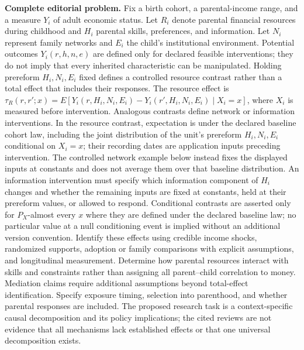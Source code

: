 \documentclass[11pt,a4paper]{article}
\begin{document}
\textbf{Complete editorial problem.} Fix a birth cohort, a parental-income range, and a measure \(Y_i\) of adult economic status. Let \(R_i\) denote parental financial resources during childhood and \(H_i\) parental skills, preferences, and information. Let \(N_i\) represent family networks and \(E_i\) the child's institutional environment. Potential outcomes \(Y_i(r,h,n,e)\) are defined only for declared feasible interventions; they do not imply that every inherited characteristic can be manipulated. Holding prereform \(H_i,N_i,E_i\) fixed defines a controlled resource contrast rather than a total effect that includes their responses. The resource effect is \(\tau_R(r,r';x)=E[Y_i(r,H_i,N_i,E_i)-Y_i(r',H_i,N_i,E_i)\mid X_i=x]\), where \(X_i\) is measured before intervention. Analogous contrasts define network or information interventions. In the resource contrast, expectation is under the declared baseline cohort law, including the joint distribution of the unit's prereform \(H_i,N_i,E_i\) conditional on \(X_i=x\); their recording dates are application inputs preceding intervention. The controlled network example below instead fixes the displayed inputs at constants and does not average them over that baseline distribution. An information intervention must specify which information component of \(H_i\) changes and whether the remaining inputs are fixed at constants, held at their prereform values, or allowed to respond. Conditional contrasts are asserted only for \(P_X\)-almost every \(x\) where they are defined under the declared baseline law; no particular value at a null conditioning event is implied without an additional version convention. Identify these effects using credible income shocks, randomized supports, adoption or family comparisons with explicit assumptions, and longitudinal measurement. Determine how parental resources interact with skills and constraints rather than assigning all parent--child correlation to money. Mediation claims require additional assumptions beyond total-effect identification. Specify exposure timing, selection into parenthood, and whether parental responses are included. The proposed research task is a context-specific causal decomposition and its policy implications; the cited reviews are not evidence that all mechanisms lack established effects or that one universal decomposition exists.
\end{document}
